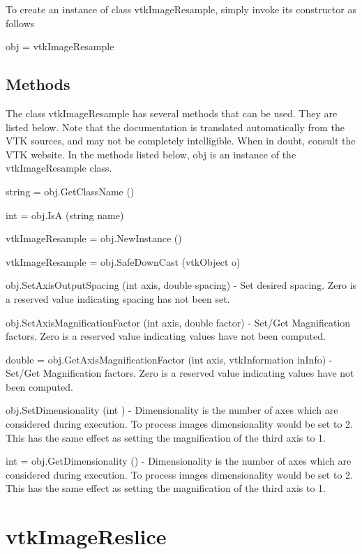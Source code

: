 To create an instance of class vtk\-Image\-Resample, simply invoke its constructor as follows \begin{DoxyVerb}  obj = vtkImageResample
\end{DoxyVerb}
 \hypertarget{vtkwidgets_vtkxyplotwidget_Methods}{}\subsection{Methods}\label{vtkwidgets_vtkxyplotwidget_Methods}
The class vtk\-Image\-Resample has several methods that can be used. They are listed below. Note that the documentation is translated automatically from the V\-T\-K sources, and may not be completely intelligible. When in doubt, consult the V\-T\-K website. In the methods listed below, {\ttfamily obj} is an instance of the vtk\-Image\-Resample class. 
\begin{DoxyItemize}
\item {\ttfamily string = obj.\-Get\-Class\-Name ()}  
\item {\ttfamily int = obj.\-Is\-A (string name)}  
\item {\ttfamily vtk\-Image\-Resample = obj.\-New\-Instance ()}  
\item {\ttfamily vtk\-Image\-Resample = obj.\-Safe\-Down\-Cast (vtk\-Object o)}  
\item {\ttfamily obj.\-Set\-Axis\-Output\-Spacing (int axis, double spacing)} -\/ Set desired spacing. Zero is a reserved value indicating spacing has not been set.  
\item {\ttfamily obj.\-Set\-Axis\-Magnification\-Factor (int axis, double factor)} -\/ Set/\-Get Magnification factors. Zero is a reserved value indicating values have not been computed.  
\item {\ttfamily double = obj.\-Get\-Axis\-Magnification\-Factor (int axis, vtk\-Information in\-Info)} -\/ Set/\-Get Magnification factors. Zero is a reserved value indicating values have not been computed.  
\item {\ttfamily obj.\-Set\-Dimensionality (int )} -\/ Dimensionality is the number of axes which are considered during execution. To process images dimensionality would be set to 2. This has the same effect as setting the magnification of the third axis to 1.  
\item {\ttfamily int = obj.\-Get\-Dimensionality ()} -\/ Dimensionality is the number of axes which are considered during execution. To process images dimensionality would be set to 2. This has the same effect as setting the magnification of the third axis to 1.  
\end{DoxyItemize}\hypertarget{vtkimaging_vtkimagereslice}{}\section{vtk\-Image\-Reslice}\label{vtkimaging_vtkimagereslice}

